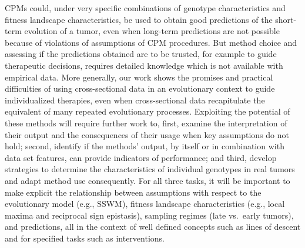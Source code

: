 \documentclass[a4paper,10pt]{article}
\begin{document}
CPMs could, under very specific combinations of genotype characteristics
and fitness landscape characteristics, be used to obtain good predictions
of the short-term evolution of a tumor, even when long-term predictions
are not possible because of violations of assumptions of CPM
procedures. But method choice and assessing if the predictions obtained
are to be trusted, for example to guide therapeutic decisions, requires
detailed knowledge which is not available with empirical data. More
generally, our work shows the promises and practical difficulties of using
cross-sectional data in an evolutionary context to guide individualized
therapies, even when cross-sectional data recapitulate the equivalent of
many repeated evolutionary processes.  %
Exploiting the potential of these methods will require further work to, first,
examine the interpretation of their output and the consequences of their
usage when key assumptions do not hold; second,
identify if the
methods' output, by itself or in combination with data set features, can
provide indicators of performance; and third, develop
strategies to determine the characteristics of individual genotypes in real tumors and adapt
method use consequently.
For all three tasks, it will be
important to make explicit the relationship between assumptions with
respect to the evolutionary model (e.g., SSWM), fitness landscape
characteristics (e.g., local maxima and reciprocal sign epistasis),
sampling regimes (late vs.\ early tumors), and predictions, all in the
context of well defined concepts such as lines of descent and for
specified tasks such as interventions.
\end{document}
